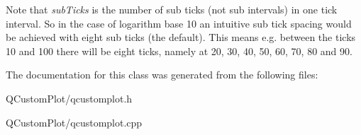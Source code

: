 Note that {\itshape sub\+Ticks} is the number of sub ticks (not sub intervals) in one tick interval. So in the case of logarithm base 10 an intuitive sub tick spacing would be achieved with eight sub ticks (the default). This means e.\+g. between the ticks 10 and 100 there will be eight ticks, namely at 20, 30, 40, 50, 60, 70, 80 and 90. 

The documentation for this class was generated from the following files\+:\begin{DoxyCompactItemize}
\item 
Q\+Custom\+Plot/qcustomplot.\+h\item 
Q\+Custom\+Plot/qcustomplot.\+cpp\end{DoxyCompactItemize}
